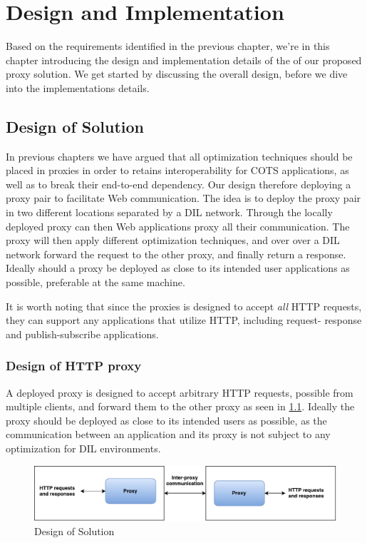 \chapter{Design and Implementation}
\label{chapter:design}

Based on the requirements identified in the previous chapter, we're in this chapter introducing the design and implementation details of the of our proposed proxy solution. We get started by discussing the overall design, before we dive into the implementations details.



\section{Design of Solution}

In previous chapters we have argued that all optimization techniques should be
placed in proxies in order to retains interoperability for COTS applications, as
well as to break their end-to-end dependency. Our design therefore deploying a
proxy pair to facilitate Web communication. The idea is to deploy the proxy pair
in two different locations separated by a DIL network. Through the locally
deployed proxy can then Web applications proxy all their communication. The
proxy will then apply different optimization techniques, and over over a DIL
network forward the request to the other proxy, and finally return a response.
Ideally should a proxy be deployed as close to its intended user applications as
possible, preferable at the same machine.


It is worth noting that since the proxies is designed to accept \textit{all} HTTP
requests, they can support any applications that utilize HTTP, including request-
response and publish-subscribe applications.


\subsection{Design of HTTP proxy}

A deployed proxy is designed to accept arbitrary HTTP requests, possible from
multiple clients, and forward them to the other proxy as seen in
\cref{figure:proxy_design}. Ideally the proxy should be deployed as close to its
intended users as possible, as the communication between an application and its
proxy is not subject to any optimization for DIL environments.

\begin{figure}[h]
\includegraphics[scale=0.55]{images/proxy_design.pdf}
\caption{Design of Solution}
\label{figure:proxy_design}
\end{figure}

